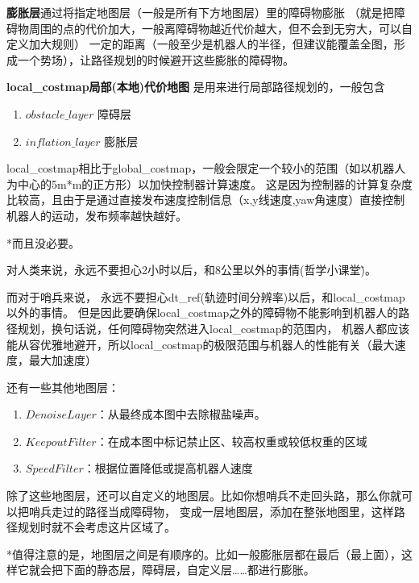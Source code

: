 \textbf{膨胀层}通过将指定地图层（一般是所有下方地图层）里的障碍物膨胀
（就是把障碍物周围的点的代价加大，一般离障碍物越近代价越大，但不会到无穷大，可以自定义加大规则）
一定的距离（一般至少是机器人的半径，但建议能覆盖全图，形成一个势场），让路径规划的时候避开这些膨胀的障碍物。

\textbf{local\_costmap局部(本地)代价地图} 是用来进行局部路径规划的，一般包含
\begin{enumerate}
    \item {$obstacle\_layer$} 障碍层
    \item {$inflation\_layer$} 膨胀层
\end{enumerate}
    local\_costmap相比于global\_costmap，一般会限定一个较小的范围（如以机器人为中心的5m*m的正方形）以加快控制器计算速度。
这是因为控制器的计算复杂度比较高，且由于是通过直接发布速度控制信息（x,y线速度,yaw角速度）直接控制机器人的运动，发布频率越快越好。

*而且没必要。

对人类来说，永远不要担心2小时以后，和8公里以外的事情(哲学小课堂\~)。

而对于哨兵来说，
永远不要担心dt\_ref(轨迹时间分辨率)以后，和local\_costmap以外的事情。
但是因此要确保local\_costmap之外的障碍物不能影响到机器人的路径规划，换句话说，任何障碍物突然进入local\_costmap的范围内，
机器人都应该能从容优雅地避开，所以local\_costmap的极限范围与机器人的性能有关（最大速度，最大加速度）

还有一些其他地图层：
\begin{enumerate}
    \item $DenoiseLayer$：从最终成本图中去除椒盐噪声。
    \item $KeepoutFilter$：在成本图中标记禁止区、较高权重或较低权重的区域
    \item $SpeedFilter$：根据位置降低或提高机器人速度
\end{enumerate}
除了这些地图层，还可以自定义的地图层。比如你想哨兵不走回头路，那么你就可以把哨兵走过的路径当成障碍物，
变成一层地图层，添加在整张地图里，这样路径规划时就不会考虑这片区域了。

*值得注意的是，地图层之间是有顺序的。比如一般膨胀层都在最后（最上面），这样它就会把下面的静态层，障碍层，自定义层……都进行膨胀。
